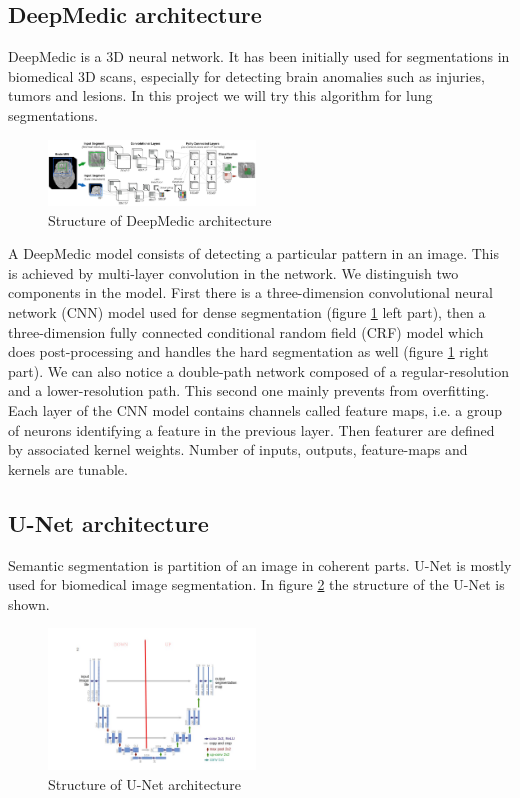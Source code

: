 \subsection{DeepMedic architecture}
DeepMedic is a 3D neural network. It has been initially used for segmentations in biomedical 3D scans, especially for detecting brain anomalies such as injuries, tumors and lesions. In this project we will try this algorithm for lung segmentations. \newline
\begin{figure}[h!]
	\includegraphics[width=0.49\textwidth, angle=0]{files/deepmedic.png}
	\caption{Structure of DeepMedic architecture}
	\label{deepmedic}
\end{figure}
 
A DeepMedic model consists of detecting a particular pattern in an image. This is achieved by multi-layer convolution in the network. We distinguish two components in the model. First there is a three-dimension convolutional neural network (CNN) model used for dense segmentation (figure \ref{deepmedic} left part), then  a three-dimension fully connected conditional random field (CRF) model which does post-processing and handles the hard segmentation as well (figure \ref{deepmedic} right part). We can also notice a double-path network composed of a regular-resolution and a lower-resolution path. This second one mainly prevents from overfitting.
Each layer of the CNN model contains channels called feature maps, i.e. a group of neurons identifying a feature in the previous layer. Then featurer are defined by associated kernel weights. Number of inputs, outputs, feature-maps and kernels are tunable.

\subsection{U-Net architecture}
Semantic segmentation is partition of an image in coherent parts. U-Net is mostly used for biomedical image segmentation. In figure \ref{unetstructure} the structure of the U-Net is shown.\newline
\begin{figure}[h!]
	\includegraphics[width=0.49\textwidth, angle=0]{files/unetstructure.jpg}
	\caption{Structure of U-Net architecture}
	\label{unetstructure}
\end{figure}


